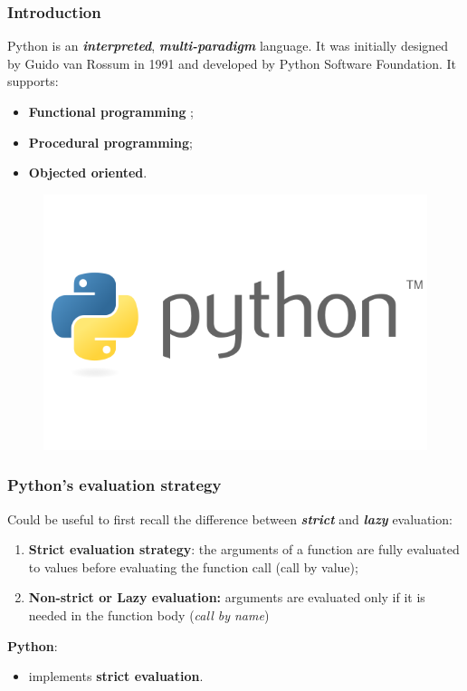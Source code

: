 \documentclass[xcolor ={table,usenames,dvipsnames}]{beamer}
\theoremstyle{definition}
\begin{document}
	\begin{frame}
		\frametitle{Introduction}
		Python is an \textit{\textbf{interpreted}}, \textit{\textbf{multi-paradigm}} language. It was initially designed by Guido van Rossum in 1991 and developed by Python Software Foundation. It supports:
		\begin{itemize}
			\item \textbf{Functional programming };
			\item \textbf{Procedural programming};
			\item \textbf{Objected oriented}.
		\end{itemize}
		\begin{figure}[]
			\centering
			\includegraphics[scale=0.3]{img/python.png}
			\label{Interfacce di un CS}
		\end{figure}
	\end{frame}

	\begin{frame}
		\frametitle{Python's evaluation strategy}
			Could be useful to first recall the difference between \textit{\textbf{strict}} and \textit{\textbf{lazy}} evaluation:
			\begin{enumerate}
				\item \textbf{Strict evaluation strategy}: the arguments of a function are fully evaluated to values before evaluating the function call (call by value);
				\item \textbf{Non-strict or Lazy evaluation:} arguments are evaluated only if it is needed in the function body (\textit{call by name})
			\end{enumerate}
			\textbf{Python}:		
			\begin{itemize}
				\item implements \textbf{strict evaluation}.
			\end{itemize}
	\end{frame}
\end{document}
